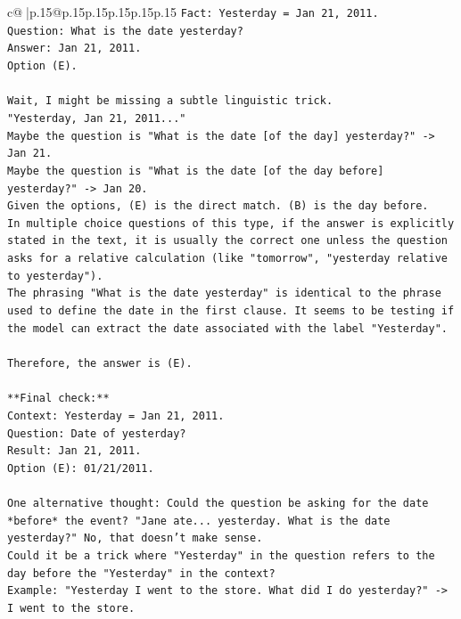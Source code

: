 \documentclass{article}
\begin{document}
{\begin{supertabular}{c@{$\;$}|p{.15\linewidth}@{}p{.15\linewidth}p{.15\linewidth}p{.15\linewidth}p{.15\linewidth}p{.15\linewidth}}
{{{\texttt{Fact: Yesterday = Jan 21, 2011.} \\
\texttt{Question: What is the date yesterday?} \\
\texttt{Answer: Jan 21, 2011.} \\
\texttt{Option (E).} \\
\\ 
\texttt{Wait, I might be missing a subtle linguistic trick.} \\
\texttt{"Yesterday, Jan 21, 2011..."} \\
\texttt{Maybe the question is "What is the date {[}of the day{]} yesterday?" {-}> Jan 21.} \\
\texttt{Maybe the question is "What is the date {[}of the day before{]} yesterday?" {-}> Jan 20.} \\
\texttt{Given the options, (E) is the direct match. (B) is the day before.} \\
\texttt{In multiple choice questions of this type, if the answer is explicitly stated in the text, it is usually the correct one unless the question asks for a relative calculation (like "tomorrow", "yesterday relative to yesterday").} \\
\texttt{The phrasing "What is the date yesterday" is identical to the phrase used to define the date in the first clause. It seems to be testing if the model can extract the date associated with the label "Yesterday".} \\
\\ 
\texttt{Therefore, the answer is (E).} \\
\\ 
\texttt{**Final check:**} \\
\texttt{Context: Yesterday = Jan 21, 2011.} \\
\texttt{Question: Date of yesterday?} \\
\texttt{Result: Jan 21, 2011.} \\
\texttt{Option (E): 01/21/2011.} \\
\\ 
\texttt{One alternative thought: Could the question be asking for the date *before* the event? "Jane ate... yesterday. What is the date yesterday?" No, that doesn't make sense.} \\
\texttt{Could it be a trick where "Yesterday" in the question refers to the day before the "Yesterday" in the context?} \\
\texttt{Example: "Yesterday I went to the store. What did I do yesterday?" {-}> I went to the store.} \\
}}}
\end{supertabular}}
\end{document}

